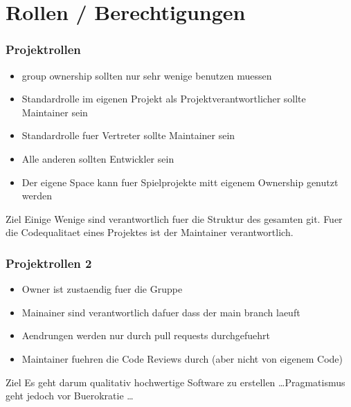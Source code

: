 \section{Rollen / Berechtigungen}
\begin{frame}
    \frametitle{Projektrollen}
    \begin{itemize}
    \item group ownership sollten nur sehr wenige benutzen muessen
    \item Standardrolle im eigenen Projekt als Projektverantwortlicher sollte Maintainer sein
    \item Standardrolle fuer Vertreter sollte Maintainer sein
    \item Alle anderen sollten Entwickler sein
    \item Der eigene Space kann fuer Spielprojekte mitt eigenem Ownership genutzt werden
    \end{itemize}
    \begin{block}{Ziel}
        Einige Wenige sind verantwortlich fuer die Struktur des gesamten git. Fuer die Codequalitaet eines Projektes ist der Maintainer verantwortlich.
    \end{block}
\end{frame}
\begin{frame}
    \frametitle{Projektrollen 2}
    \begin{itemize}
    \item Owner ist zustaendig fuer die Gruppe
    \item Mainainer sind verantwortlich dafuer dass der main branch laeuft
    \item Aendrungen werden nur durch pull requests durchgefuehrt
    \item Maintainer fuehren die Code Reviews durch (aber nicht von eigenem Code)
    \end{itemize}
    \begin{block}{Ziel}
        Es geht darum qualitativ hochwertige Software zu erstellen \dots Pragmatismus geht jedoch vor Buerokratie \dots
    \end{block}
\end{frame}